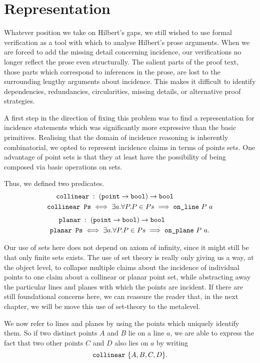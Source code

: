 \section{Representation}
Whatever position we take on Hilbert's gaps, we still wished to use formal verification as a tool with which to analyse Hilbert's prose arguments. When we are forced to add the missing detail concerning incidence, our verifications no longer reflect the prose even structurally. The salient parts of the proof text, those parts which correspond to inferences in the prose, are lost to the surrounding lengthy arguments about incidence. This makes it difficult to identify dependencies, redundancies, circularities, missing details, or alternative proof strategies.

A first step in the direction of fixing this problem was to find a representation for incidence statements which was significantly more expressive than the basic primitives. Realising that the domain of incidence reasoning is inherently combinatorial, we opted to represent incidence claims in terms of points sets. One advantage of point sets is that they at least have the possibility of being composed via basic operations on sets.

Thus, we defined two predicates.
\begin{align*}
\texttt{collinear}\;&:\;(\texttt{point}\rightarrow\texttt{bool})\rightarrow\texttt{bool}
\\\texttt{collinear\ Ps} &\iff \exists a. \forall P. P \in Ps \implies \texttt{on\_line}\ P\ a
\end{align*}
\begin{align*}
\texttt{planar}\;&:\;(\texttt{point}\rightarrow\texttt{bool})\rightarrow\texttt{bool}
\\\texttt{planar\ Ps} &\iff \exists a. \forall P. P \in Ps \implies \texttt{on\_plane}\ P\ a.
\end{align*}

Our use of sets here does not depend on axiom of infinity, since it might still be that only finite sets exists. The use of set theory is really only giving us a way, at the object level, to collapse multiple claims about the incidence of individual points to one claim about a collinear or planar point set, while abstracting away the particular lines and planes with which the points are incident. If there are still foundational concerns here, we can reassure the reader that, in the next chapter, we will be move this use of set-theory to the metalevel.

We now refer to lines and planes by using the points which uniquely identify them. So if two distinct points $A$ and $B$ lie on a line $a$, we are able to express the fact that two other points $C$ and $D$ also lies on $a$ by writing 
\begin{displaymath}
\texttt{collinear}\ \{A, B, C, D\}.
\end{displaymath}

